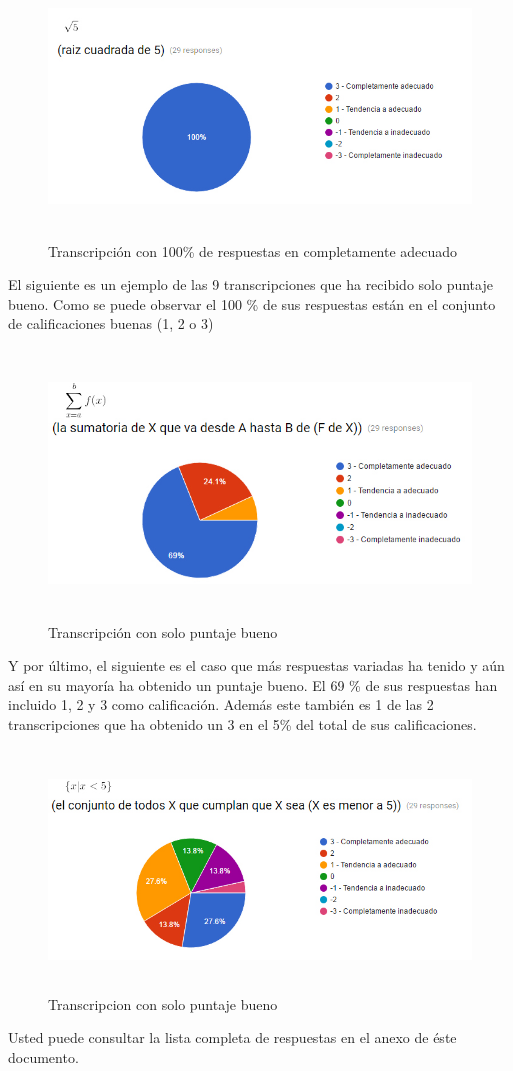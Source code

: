 \begin{figure}[H]
\centering
  \includegraphics[width=15cm, height=6.93cm]{Figures/captura2}
  \caption[]{Transcripción con 100\% de respuestas en completamente adecuado}
\label{fig:captura2}
\end{figure}

El siguiente es un ejemplo de las 9 transcripciones que ha recibido solo puntaje bueno. Como se puede observar el 100 \% de sus respuestas están en el conjunto de calificaciones buenas (1, 2 o 3)

\begin{figure}[H]
\centering
  \includegraphics[width=15cm, height=7.15cm]{Figures/captura1}
  \caption[]{Transcripción con solo puntaje bueno}
\label{fig:captura1}
\end{figure}

Y por último, el siguiente es el caso que más respuestas variadas ha tenido y aún así en su mayoría ha obtenido un puntaje bueno. El 69 \% de sus respuestas han incluido 1, 2 y 3 como calificación. Además este también es 1 de las 2 transcripciones que ha obtenido un 3 en el 5\% del total de sus calificaciones.

\begin{figure}[H]
\centering
  \includegraphics[width=15cm, height=6.39cm]{Figures/captura3}
  \caption[]{Transcripcion con solo puntaje bueno}
\label{fig:captura3}
\end{figure}

Usted puede consultar la lista completa de respuestas en el anexo de éste documento.